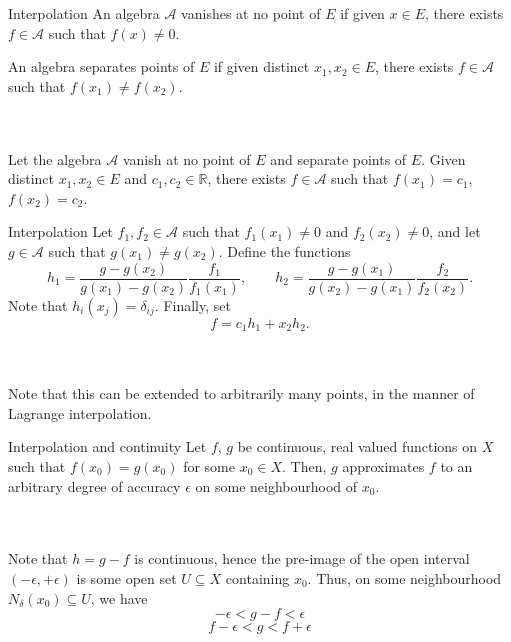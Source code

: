 \documentclass{beamer}
\def\R{\mathbb{R}}
\begin{document}
    \begin{frame}{Interpolation}
        An algebra $\mathscr{A}$ vanishes at no point of $E$ if given $x \in E$,
        there exists $f \in \mathscr{A}$ such that $f(x) \neq 0$.

        An algebra separates points of $E$ if given distinct $x_1, x_2 \in E$, there
        exists $f \in \mathscr{A}$ such that $f(x_1) \neq f(x_2)$.

        \\~\\

        Let the algebra $\mathscr{A}$ vanish at no point of $E$ and separate
        points of $E$. Given distinct $x_1, x_2 \in E$ and $c_1, c_2 \in \R$, there
        exists $f \in \mathscr{A}$ such that $f(x_1) = c_1$, $f(x_2) = c_2$.
    \end{frame}

    \begin{frame}{Interpolation}
        Let $f_1, f_2 \in \mathscr{A}$ such that $f_1(x_1) \neq 0$ and $f_2(x_2) \neq
        0$, and let $g \in \mathscr{A}$ such that $g(x_1) \neq g(x_2)$. Define the
        functions \[
            h_1 = \frac{g - g(x_2)}{g(x_1) - g(x_2)} \frac{f_1}{f_1(x_1)}, \qquad
            h_2 = \frac{g - g(x_1)}{g(x_2) - g(x_1)} \frac{f_2}{f_2(x_2)}.
        \] Note that $h_i(x_j) = \delta_{ij}$. Finally, set \[
            f = c_1 h_1 + x_2 h_2. \tag*{\qed}
        \] 

        \\~\\

        Note that this can be extended to arbitrarily many points, in the manner of
        Lagrange interpolation.
    \end{frame}

    \begin{frame}{Interpolation and continuity}
        Let $f$, $g$ be continuous, real valued functions on $X$ such that $f(x_0) =
        g(x_0)$ for some $x_0 \in X$. Then, $g$ approximates $f$ to an arbitrary
        degree of accuracy $\epsilon$ on some neighbourhood of $x_0$.

        \\~\\

        Note that $h = g - f$ is continuous, hence the pre-image of the open interval
        $(-\epsilon, +\epsilon)$ is some open set $U \subseteq X$ containing
        $x_0$. Thus, on some neighbourhood $N_\delta(x_0) \subseteq U$, we have \[
            -\epsilon < g - f < \epsilon
        \] \[
            f - \epsilon < g < f + \epsilon \tag*{\qed}
        \] 
    \end{frame}
\end{document}
